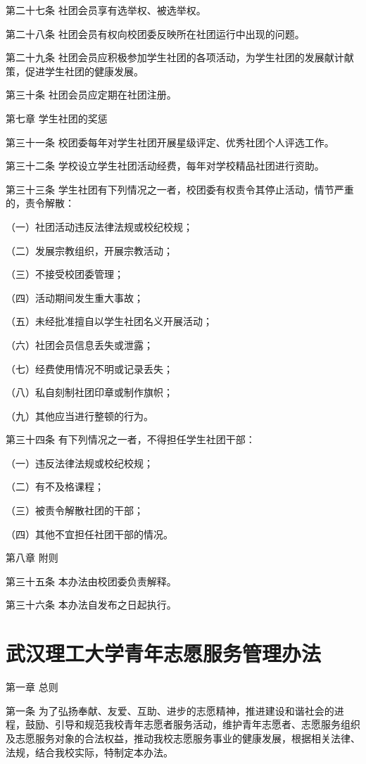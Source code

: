 \documentclass[UTF8,12pt,a4paper]{report}
\begin{document}
第二十七条  社团会员享有选举权、被选举权。

第二十八条  社团会员有权向校团委反映所在社团运行中出现的问题。

第二十九条  社团会员应积极参加学生社团的各项活动，为学生社团的发展献计献策，促进学生社团的健康发展。

第三十条  社团会员应定期在社团注册。



第七章  学生社团的奖惩

第三十一条  校团委每年对学生社团开展星级评定、优秀社团个人评选工作。

第三十二条  学校设立学生社团活动经费，每年对学校精品社团进行资助。

第三十三条  学生社团有下列情况之一者，校团委有权责令其停止活动，情节严重的，责令解散：

（一）社团活动违反法律法规或校纪校规；

（二）发展宗教组织，开展宗教活动；

（三）不接受校团委管理；

（四）活动期间发生重大事故；

（五）未经批准擅自以学生社团名义开展活动；

（六）社团会员信息丢失或泄露；

（七）经费使用情况不明或记录丢失；

（八）私自刻制社团印章或制作旗帜；

（九）其他应当进行整顿的行为。

第三十四条  有下列情况之一者，不得担任学生社团干部：

（一）违反法律法规或校纪校规；

（二）有不及格课程；

（三）被责令解散社团的干部；

（四）其他不宜担任社团干部的情况。



第八章  附则

第三十五条  本办法由校团委负责解释。

第三十六条  本办法自发布之日起执行。  

\chapter{武汉理工大学青年志愿服务管理办法}
第一章  总则

第一条 为了弘扬奉献、友爱、互助、进步的志愿精神，推进建设和谐社会的进程，鼓励、引导和规范我校青年志愿者服务活动，维护青年志愿者、志愿服务组织及志愿服务对象的合法权益，推动我校志愿服务事业的健康发展，根据相关法律、法规，结合我校实际，特制定本办法。
\end{document}
